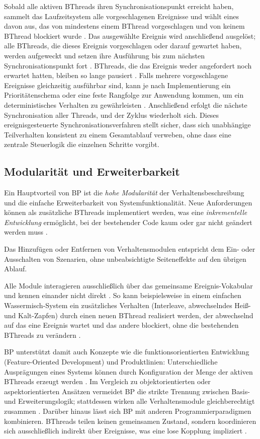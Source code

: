 Sobald alle aktiven BThreads ihren Synchronisationspunkt erreicht haben, sammelt das Laufzeitsystem alle vorgeschlagenen Ereignisse und wählt eines davon aus, das von mindestens einem BThread vorgeschlagen und von keinem BThread blockiert wurde \cite{Harel2012}.
Das ausgewählte Ereignis wird anschließend ausgelöst; alle BThreads, die dieses Ereignis vorgeschlagen oder darauf gewartet haben, werden aufgeweckt und setzen ihre Ausführung bis zum nächsten Synchronisationspunkt fort \cite{Harel2012}.
BThreads, die das Ereignis weder angefordert noch erwartet hatten, bleiben so lange pausiert \cite{Harel2012}.
Falls mehrere vorgeschlagene Ereignisse gleichzeitig ausführbar sind, kann je nach Implementierung ein Prioritätenschema oder eine feste Rangfolge zur Anwendung kommen, um ein deterministisches Verhalten zu gewährleisten \cite{Harel2012}.
Anschließend erfolgt die nächste Synchronisation aller Threads, und der Zyklus wiederholt sich.
Dieses ereignisgesteuerte Synchronisationsverfahren stellt sicher, dass sich unabhängige Teilverhalten konsistent zu einem Gesamtablauf verweben, ohne dass eine zentrale Steuerlogik die einzelnen Schritte vorgibt.

\subsection{Modularität und Erweiterbarkeit}\label{subsec:modularitat-und-erweiterbarkeit}
Ein Hauptvorteil von BP ist die \emph{hohe Modularität} der Verhaltensbeschreibung und die einfache Erweiterbarkeit von Systemfunktionalität.
Neue Anforderungen können als zusätzliche BThreads implementiert werden, was eine \emph{inkrementelle Entwicklung} ermöglicht, bei der bestehender Code kaum oder gar nicht geändert werden muss \cite{Harel2012}.

Das Hinzufügen oder Entfernen von Verhaltensmodulen entspricht dem Ein- oder Ausschalten von Szenarien, ohne unbeabsichtigte Seiteneffekte auf den übrigen Ablauf.

Alle Module interagieren ausschließlich über das gemeinsame Ereignis-Vokabular und kennen einander nicht direkt \cite{Harel2010}.
So kann beispielsweise in einem einfachen Wassermisch-System ein zusätzliches Verhalten (Interleave, abwechselndes Heiß- und Kalt-Zapfen) durch einen neuen BThread realisiert werden, der abwechselnd auf das eine Ereignis wartet und das andere blockiert, ohne die bestehenden BThreads zu verändern \cite{Harel2012}.

BP unterstützt damit auch Konzepte wie die funktionsorientierten Entwicklung (Feature-Oriented Development) und Produktlinien: Unterschiedliche Ausprägungen eines Systems können durch Konfiguration der Menge der aktiven BThreads erzeugt werden \cite{Harel2012}.
Im Vergleich zu objektorientierten oder aspektorientierten Ansätzen vermeidet BP die strikte Trennung zwischen Basis- und Erweiterungslogik; stattdessen wirken alle Verhaltensmodule gleichberechtigt zusammen \cite{Harel2012}.
Darüber hinaus lässt sich BP mit anderen Programmierparadigmen kombinieren.
BThreads teilen keinen gemeinsamen Zustand, sondern koordinieren sich ausschließlich indirekt über Ereignisse, was eine lose Kopplung impliziert \cite{Harel2012}.
